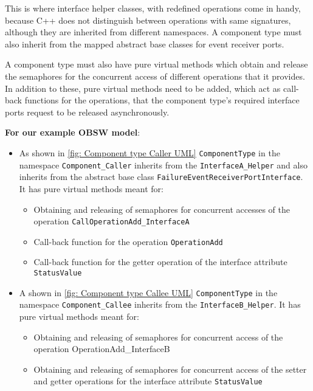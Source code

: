 This is where interface helper classes, with redefined operations come in handy, because C++ does not distinguish between operations with same signatures, although they are inherited from different namespaces. A component type must also inherit from the mapped abstract base classes for event receiver ports.

A component type must also have pure virtual methods which obtain and release the semaphores for the concurrent access of different operations that it provides. In addition to these, pure virtual methods need to be added, which act as call-back functions for the operations, that the component type's required interface ports request to be released asynchronously.   

\textbf{For our example OBSW model}:
\begin{itemize}
\item As shown in \cref{fig: Component type Caller UML} \texttt{ComponentType} in the namespace \texttt{Component\_Caller} inherits from the \texttt{InterfaceA\allowbreak\_Helper} and also inherits from the abstract base class \texttt{FailureEvent\allowbreak ReceiverPort\allowbreak Interface}. 
It has pure virtual methods meant for:

\begin{itemize}
\item Obtaining and releasing of semaphores for concurrent accesses of the operation \texttt{CallOperationAdd\allowbreak\_InterfaceA}
\item Call-back function for the operation \texttt{OperationAdd}
\item Call-back function for the getter operation of the interface attribute \texttt{StatusValue} 
\end{itemize}

\item A shown in \cref{fig: Component type Callee UML} \texttt{ComponentType} in the namespace \texttt{Component\_Callee} inherits from the \texttt{InterfaceB\allowbreak\_Helper}. 
It has pure virtual methods meant for:

\begin{itemize}
\item Obtaining and releasing of semaphores for concurrent access of the operation {OperationAdd\allowbreak\_InterfaceB}
\item Obtaining and releasing of semaphores for concurrent access of the setter and getter operations for the interface attribute \texttt{StatusValue}
\end{itemize}   
\end{itemize}


